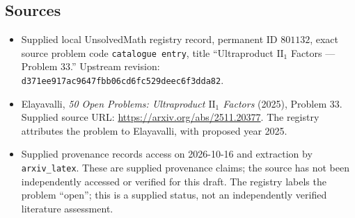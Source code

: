 \documentclass[11pt]{article}
\begin{document}
\subsection{Sources}
\begin{itemize}
\item Supplied local UnsolvedMath registry record, permanent ID \(801132\), exact source problem code \texttt{catalogue entry}, title ``Ultraproduct \(\mathrm{II}_1\) Factors --- Problem 33.'' Upstream revision: \texttt{d371ee917ac9647fbb06cd6fc529deec6f3dda82}.
\item Elayavalli, \emph{50 Open Problems: Ultraproduct \(\mathrm{II}_1\) Factors} (2025), Problem 33. Supplied source URL: \url{https://arxiv.org/abs/2511.20377}. The registry attributes the problem to Elayavalli, with proposed year 2025.
\item Supplied provenance records access on 2026-10-16 and extraction by \texttt{arxiv\_latex}. These are supplied provenance claims; the source has not been independently accessed or verified for this draft. The registry labels the problem ``open''; this is a supplied status, not an independently verified literature assessment.
\end{itemize}
\end{document}
